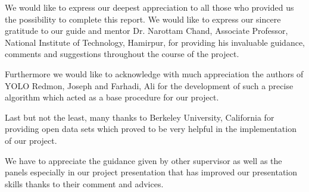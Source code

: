 \begin{acknowledgments}

We would like to express our deepest appreciation to all those who provided us the possibility to complete this report.  We would like to express our sincere gratitude to our guide and mentor Dr. Narottam Chand, Associate Professor, National Institute of Technology, Hamirpur, for providing his invaluable guidance, comments and suggestions throughout the course of the project.

Furthermore we would like to acknowledge with much appreciation the authors of YOLO Redmon, Joseph and Farhadi, Ali for the development of such a precise algorithm which acted as a base procedure for our project.

Last but not the least, many thanks to Berkeley University, California for providing open data sets which proved to be very helpful in the implementation of our project. 

We have to appreciate the guidance given by other supervisor as well as the panels especially in our project presentation that has improved our presentation skills thanks to their comment and advices.
\end{acknowledgments}
